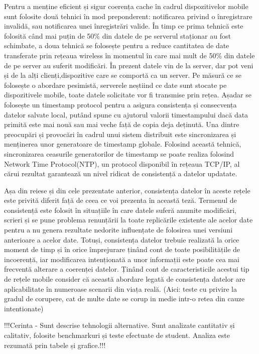 \documentclass[12pt,a4paper]{report}
\begin{document}
Pentru a menține eficient și sigur coerența cache\cite{knaesel2009high} în cadrul dispozitivelor mobile sunt folosite două tehnici în mod preponderent: notificarea privind o înregistrare invalidă, sau notificarea unei înregistrări valide. În timp ce prima tehnică este folosită când mai puțin de 50\% din datele de pe serverul staționar au fost schimbate, a doua tehnică se folosește pentru a reduce cantitatea de date transferate prin rețeaua wireless în momentul în care mai mult de 50\% din datele de pe server au suferit modificări. În prezent datele vin de la server, dar pot veni și de la alți clienți,dispozitive care se comportă ca un server. Pe măsură ce se folosește o abordare pesimistă, serverele neștiind ce date sunt stocate pe dispozitivele mobile, toate datele solicitate vor fi transmise prin rețea. Așadar se folosește un timestamp protocol pentru a asigura consistența și consecvența datelor salvate local, putând spune cu ajutorul valorii timestampului dacă data primită este mai nouă sau mai veche față de copia deja deținută. Una dintre preocupări și provocări în cadrul unui sistem distribuit este sincronizarea și menținerea unor generatoare de timestamp globale. Folosind această tehnică, sincronizarea ceasurile generatorilor de timestamp se poate realiza folosind Network Time Protocol(NTP), un protocol disponibil în rețeaua TCP/IP, al cărui rezultat garantează un nivel ridicat de consistență a datelor updatate.

Așa din reiese și din cele prezentate anterior, consistența datelor în aceste rețele este privită diferit față de ceea ce voi prezenta în această teză. Termenul de consistență este folosit în situațiile în care datele suferă anumite modificări, scrieri și se pune problema renunțării la toate replicările existente ale acelor date pentru a nu genera rezultate nedorite influențate de folosirea unei versiuni anterioare a acelor date. Totuși, consistența datelor trebuie realizată la orice moment de timp și în orice împrejurare ținând cont de toate posibilitățile de incoerență, iar modificarea intenționată a unor informații este poate cea mai frecventă alterare a coerenței datelor. Ținând cont de caracteristicile acestui tip de rețele mobile consider că această abordare legată de consistența datelor are aplicabilitate în numeroase scenarii din viața reală.  (Aici: teste cu privire la gradul de corupere, cat de multe date se corup in medie intr-o retea din cauze intentionate)  


!!!Cerinta - Sunt descrise tehnologii alternative. Sunt analizate cantitativ și calitativ, folosite benchmarkuri și teste efectuate de student. Analiza este rezumată prin tabele și grafice.!!!
\end{document}
